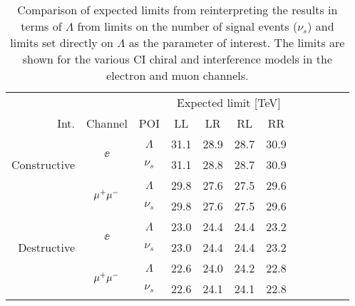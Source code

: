 \begin{table}[htp]
    \begin{center}  
{\begin{tabular}{r c c c c c c c c c c c}\toprule
    & & & \multicolumn{4}{c}{Expected limit [TeV]} \\
    Int. & Channel & POI & LL & LR & RL & RR \\
    \midrule
    \multirow{3}{*}[-1em]{\begin{sideways}Constructive\end{sideways}} & \multirow{2}{*}{$\ee$} & $\Lambda$ & 31.1 & 28.9 & 28.7 & 30.9 \\
    & & $\nu_s$ & 31.1 & 28.8 & 28.7 & 30.9 \\
    \cmidrule{2-7}
     & \multirow{2}{*}{$\mu^{+} \mu^{-}$} & $\Lambda$ & 29.8 & 27.6 & 27.5 & 29.6 \\
    & & $\nu_s$ & 29.8 & 27.6 & 27.5 & 29.6 \\
    \midrule
    \multirow{3}{*}[-1em]{\begin{sideways}Destructive\end{sideways}} & \multirow{2}{*}{$\ee$} & $\Lambda$ & 23.0 & 24.4 & 24.4 & 23.2 \\
    & & $\nu_s$ & 23.0 & 24.4 & 24.4 & 23.2 \\
    \cmidrule{2-7}
     & \multirow{2}{*}{$\mu^{+} \mu^{-}$} & $\Lambda$ & 22.6 & 24.0 & 24.2 & 22.8 \\
    & & $\nu_s$ & 22.6 & 24.1 & 24.1 & 22.8 \\
\bottomrule\end{tabular}}
\caption{Comparison of expected limits from reinterpreting the results in terms of $\Lambda$ from limits on the number of signal events ($\nu_s$) and limits set directly on $\Lambda$ as the parameter of interest. The limits are shown for the various CI chiral and interference models in the electron and muon channels.}  
\label{tab:limits_comparePOI}
\end{center}
\end{table}

\clearpage

